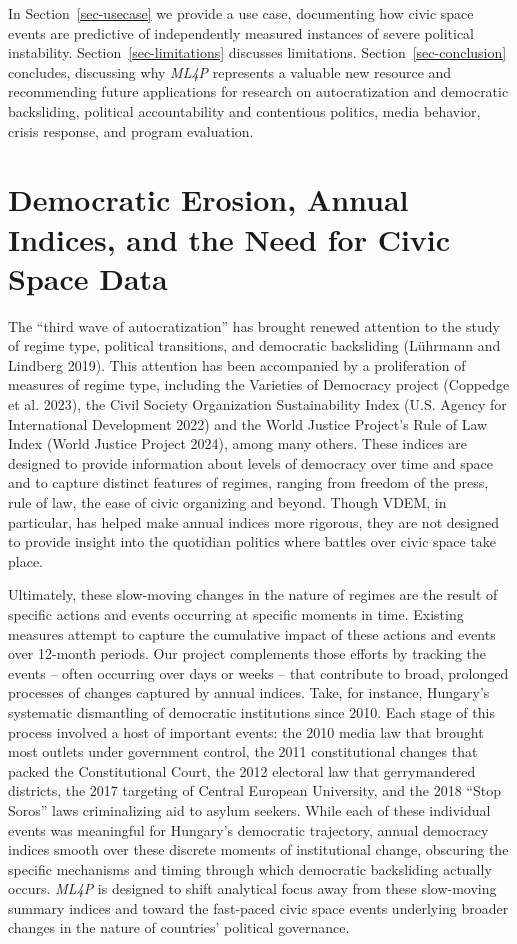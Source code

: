 \documentclass[
  letterpaper,
  DIV=11,
  numbers=noendperiod]{scrartcl}
\begin{document}
In Section~\ref{sec-usecase} we provide a use case, documenting how
civic space events are predictive of independently measured instances of
severe political instability. Section~\ref{sec-limitations} discusses
limitations. Section~\ref{sec-conclusion} concludes, discussing why
\emph{ML4P} represents a valuable new resource and recommending future
applications for research on autocratization and democratic backsliding,
political accountability and contentious politics, media behavior,
crisis response, and program evaluation.

\hypertarget{sec-background}{%
\section{Democratic Erosion, Annual Indices, and the Need for Civic
Space Data}\label{sec-background}}

The ``third wave of autocratization'' has brought renewed attention to
the study of regime type, political transitions, and democratic
backsliding (Lührmann and Lindberg 2019). This attention has been
accompanied by a proliferation of measures of regime type, including the
Varieties of Democracy project (Coppedge et al. 2023), the Civil Society
Organization Sustainability Index (U.S. Agency for International
Development 2022) and the World Justice Project's Rule of Law Index
(World Justice Project 2024), among many others. These indices are
designed to provide information about levels of democracy over time and
space and to capture distinct features of regimes, ranging from freedom
of the press, rule of law, the ease of civic organizing and beyond.
Though VDEM, in particular, has helped make annual indices more
rigorous, they are not designed to provide insight into the quotidian
politics where battles over civic space take place.

Ultimately, these slow-moving changes in the nature of regimes are the
result of specific actions and events occurring at specific moments in
time. Existing measures attempt to capture the cumulative impact of
these actions and events over 12-month periods. Our project complements
those efforts by tracking the events -- often occurring over days or
weeks -- that contribute to broad, prolonged processes of changes
captured by annual indices. Take, for instance, Hungary's systematic
dismantling of democratic institutions since 2010. Each stage of this
process involved a host of important events: the 2010 media law that
brought most outlets under government control, the 2011 constitutional
changes that packed the Constitutional Court, the 2012 electoral law
that gerrymandered districts, the 2017 targeting of Central European
University, and the 2018 ``Stop Soros'' laws criminalizing aid to asylum
seekers. While each of these individual events was meaningful for
Hungary's democratic trajectory, annual democracy indices smooth over
these discrete moments of institutional change, obscuring the specific
mechanisms and timing through which democratic backsliding actually
occurs. \emph{ML4P} is designed to shift analytical focus away from
these slow-moving summary indices and toward the fast-paced civic space
events underlying broader changes in the nature of countries' political
governance.
\end{document}
